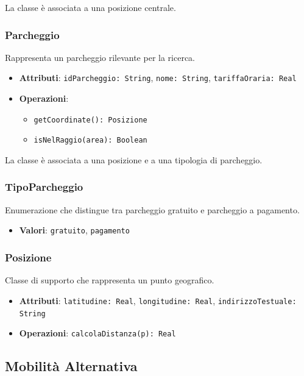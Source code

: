 \documentclass[12pt,a4paper]{article}
\begin{document}
La classe è associata a una posizione centrale.

\subsubsection{Parcheggio}
Rappresenta un parcheggio rilevante per la ricerca.

\begin{itemize}
    \item \textbf{Attributi}: \texttt{idParcheggio: String}, \texttt{nome: String}, \texttt{tariffaOraria: Real}
    \item \textbf{Operazioni}:
    \begin{itemize}
        \item \texttt{getCoordinate(): Posizione}
        \item \texttt{isNelRaggio(area): Boolean}
    \end{itemize}
\end{itemize}

La classe è associata a una posizione e a una tipologia di parcheggio.

\subsubsection{TipoParcheggio}
Enumerazione che distingue tra parcheggio gratuito e parcheggio a pagamento.

\begin{itemize}
    \item \textbf{Valori}: \texttt{gratuito}, \texttt{pagamento}
\end{itemize}

\subsubsection{Posizione}
Classe di supporto che rappresenta un punto geografico.

\begin{itemize}
    \item \textbf{Attributi}: \texttt{latitudine: Real}, \texttt{longitudine: Real}, \texttt{indirizzoTestuale: String}
    \item \textbf{Operazioni}: \texttt{calcolaDistanza(p): Real}
\end{itemize}

\subsection{Mobilità Alternativa}
\end{document}
